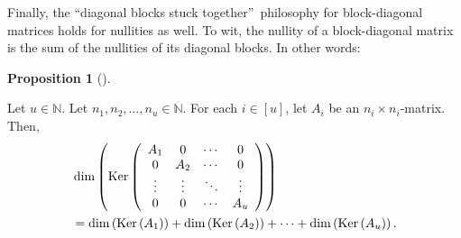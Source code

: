 \documentclass[numbers=enddot,12pt,final,onecolumn,notitlepage]{scrartcl}%
\numberwithin{exer}{subsection}
\theoremstyle{definition}
\newtheorem{prop}[theo]{Proposition}
\newenvironment{proposition}[1][]
{\begin{prop}[#1]\begin{leftbar}}
{\end{leftbar}\end{prop}}
\begin{document}
Finally, the \textquotedblleft diagonal blocks stuck
together\textquotedblright\ philosophy for block-diagonal matrices holds for
nullities as well. To wit, the nullity of a block-diagonal matrix is the sum
of the nullities of its diagonal blocks. In other words:

\begin{proposition}
\label{prop.blockmatrix.nullity-diag}Let $u\in\mathbb{N}$. Let $n_{1}%
,n_{2},\ldots,n_{u}\in\mathbb{N}$. For each $i\in\left[  u\right]  $, let
$A_{i}$ be an $n_{i}\times n_{i}$-matrix. Then,%
\begin{align}
&  \dim\left(  \operatorname*{Ker}\left(
\begin{array}
[c]{cccc}%
A_{1} & 0 & \cdots & 0\\
0 & A_{2} & \cdots & 0\\
\vdots & \vdots & \ddots & \vdots\\
0 & 0 & \cdots & A_{u}%
\end{array}
\right)  \right) \nonumber\\
&  =\dim\left(  \operatorname*{Ker}\left(  A_{1}\right)  \right)  +\dim\left(
\operatorname*{Ker}\left(  A_{2}\right)  \right)  +\cdots+\dim\left(
\operatorname*{Ker}\left(  A_{u}\right)  \right)  .
\label{eq.prop.blockmatrix.nullity-diag.clm}%
\end{align}

\end{proposition}
\end{document}
